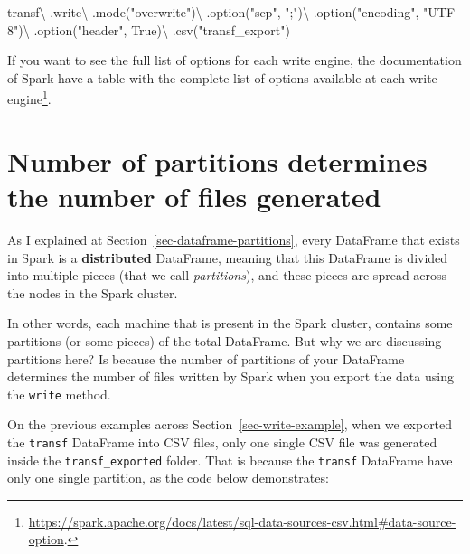 \documentclass[
  11pt,
  letterpaper,
  DIV=11,
  numbers=noendperiod]{scrreprt}
\newenvironment{Shaded}{\begin{snugshade}}{\end{snugshade}}
\newcommand{\NormalTok}[1]{\textcolor[rgb]{0.00,0.23,0.31}{#1}}
\newcommand{\OperatorTok}[1]{\textcolor[rgb]{0.37,0.37,0.37}{#1}}
\newcommand{\StringTok}[1]{\textcolor[rgb]{0.13,0.47,0.30}{#1}}
\newcommand{\VariableTok}[1]{\textcolor[rgb]{0.07,0.07,0.07}{#1}}
\begin{document}
\begin{Shaded}
\begin{Highlighting}[]
\NormalTok{transf}\OperatorTok{\textbackslash{}}
\NormalTok{    .write}\OperatorTok{\textbackslash{}}
\NormalTok{    .mode(}\StringTok{"overwrite"}\NormalTok{)}\OperatorTok{\textbackslash{}}
\NormalTok{    .option(}\StringTok{"sep"}\NormalTok{, }\StringTok{";"}\NormalTok{)}\OperatorTok{\textbackslash{}}
\NormalTok{    .option(}\StringTok{"encoding"}\NormalTok{, }\StringTok{"UTF{-}8"}\NormalTok{)}\OperatorTok{\textbackslash{}}
\NormalTok{    .option(}\StringTok{"header"}\NormalTok{, }\VariableTok{True}\NormalTok{)}\OperatorTok{\textbackslash{}}
\NormalTok{    .csv(}\StringTok{"transf\_export"}\NormalTok{)}
\end{Highlighting}
\end{Shaded}

If you want to see the full list of options for each write engine, the
documentation of Spark have a table with the complete list of options
available at each write engine\footnote{\url{https://spark.apache.org/docs/latest/sql-data-sources-csv.html\#data-source-option}.}.

\hypertarget{number-of-partitions-determines-the-number-of-files-generated}{%
\section{Number of partitions determines the number of files
generated}\label{number-of-partitions-determines-the-number-of-files-generated}}

As I explained at Section~\ref{sec-dataframe-partitions}, every
DataFrame that exists in Spark is a \textbf{distributed} DataFrame,
meaning that this DataFrame is divided into multiple pieces (that we
call \emph{partitions}), and these pieces are spread across the nodes in
the Spark cluster.

In other words, each machine that is present in the Spark cluster,
contains some partitions (or some pieces) of the total DataFrame. But
why we are discussing partitions here? Is because the number of
partitions of your DataFrame determines the number of files written by
Spark when you export the data using the \texttt{write} method.

On the previous examples across Section~\ref{sec-write-example}, when we
exported the \texttt{transf} DataFrame into CSV files, only one single
CSV file was generated inside the \texttt{transf\_exported} folder. That
is because the \texttt{transf} DataFrame have only one single partition,
as the code below demonstrates:
\end{document}
